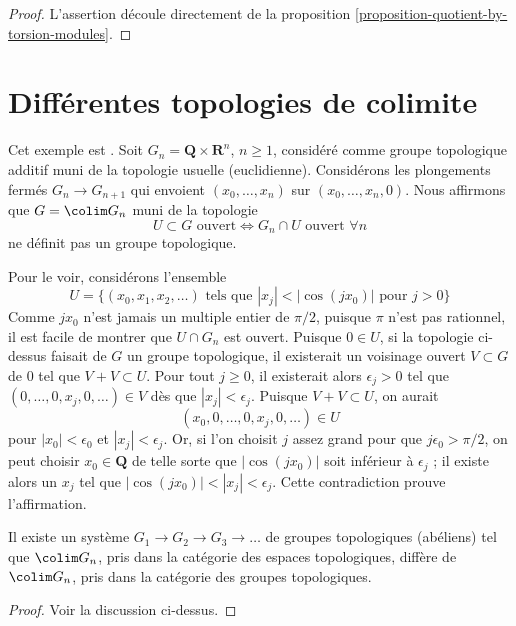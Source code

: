 \begin{proof}
L'assertion découle directement de la
proposition \ref{proposition-quotient-by-torsion-modules}.
\end{proof}




\section{Différentes topologies de colimite}
\label{section-colimit-topology}

\noindent
Cet exemple est \cite[exemple 1.2, page 553]{TSH}. Soit
$G_n = \mathbf{Q} \times \mathbf{R}^n$, $n \geq 1$, considéré comme groupe topologique
additif muni de la topologie usuelle (euclidienne). Considérons les
plongements fermés $G_n \to G_{n + 1}$ qui envoient
$(x_0, \ldots, x_n)$ sur $(x_0, \ldots, x_n, 0)$. Nous affirmons que
$G = \colim G_n$ muni de la topologie
$$
U \subset G\text{ ouvert} \Leftrightarrow G_n \cap U\text{ ouvert }\forall n
$$
ne définit pas un groupe topologique.

\medskip\noindent
Pour le voir, considérons l'ensemble
$$
U = \{(x_0, x_1, x_2, \ldots)\text{ tels que }
|x_j| < |\cos(jx_0)| \text{ pour } j > 0\}
$$
Comme $jx_0$ n'est jamais un multiple entier de $\pi/2$, puisque $\pi$
n'est pas rationnel, il est facile de montrer que $U \cap G_n$ est ouvert.
Puisque $0 \in U$, si la topologie ci-dessus faisait de $G$ un groupe
topologique, il existerait un voisinage ouvert $V \subset G$ de $0$
tel que $V + V \subset U$. Pour tout $j \geq 0$, il existerait alors
$\epsilon_j > 0$ tel que $(0, \ldots, 0, x_j, 0, \ldots) \in V$
dès que $|x_j| < \epsilon_j$. Puisque $V + V \subset U$, on aurait
$$
(x_0, 0, \ldots, 0, x_j, 0, \ldots) \in U
$$
pour $|x_0| < \epsilon_0$ et $|x_j| < \epsilon_j$. Or, si l'on choisit
$j$ assez grand pour que $j \epsilon_0 > \pi/2$, on peut choisir
$x_0 \in \mathbf{Q}$ de telle sorte que $|\cos(jx_0)|$ soit inférieur à
$\epsilon_j$ ; il existe alors un $x_j$ tel que
$|\cos(jx_0)| < |x_j| < \epsilon_j$. Cette contradiction prouve l'affirmation.

\begin{lemma}
\label{lemma-colimit-topology}
Il existe un système $G_1 \to G_2 \to G_3 \to \ldots$ de groupes
topologiques (abéliens) tel que $\colim G_n$, pris dans la catégorie des
espaces topologiques, diffère de $\colim G_n$, pris dans la catégorie
des groupes topologiques.
\end{lemma}

\begin{proof}
Voir la discussion ci-dessus.
\end{proof}






